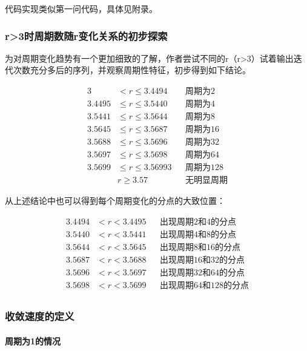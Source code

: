 \documentclass[10pt, a4paper]{article}
\begin{document}
    代码实现类似第一问代码，具体见附录。

    \subsubsection{r>3时周期数随r变化关系的初步探索}

    为对周期变化趋势有一个更加细致的了解，作者尝试不同的r（r>3）试着输出迭代次数充分多后的序列，并观察周期性特征，初步得到如下结论。

    \begin{align*}
        3&<r\le 3.4494 & &\text{周期为2}\\
        3.4495&\le r \le 3.5440 & &\text{周期为4}\\
        3.5441&\le r \le 3.5644 & &\text{周期为8}\\
        3.5645&\le r \le 3.5687 & &\text{周期为16}\\
        3.5688&\le r \le 3.5696 & &\text{周期为32}\\
        3.5697&\le r \le 3.5698 & &\text{周期为64}\\
        3.5699&\le r \le 3.56993 & &\text{周期为128}\\
        &r\ge3.57 & &\text{无明显周期}
    \end{align*}

    从上述结论中也可以得到每个周期变化的分点的大致位置：

    \begin{align*}
        3.4494&< r < 3.4495 & &\text{出现周期2和4的分点}\\
        3.5440&< r < 3.5441 & &\text{出现周期4和8的分点}\\
        3.5644&< r < 3.5645 & &\text{出现周期8和16的分点}\\
        3.5687&< r < 3.5688 & &\text{出现周期16和32的分点}\\
        3.5696&< r < 3.5697 & &\text{出现周期32和64的分点}\\
        3.5698&< r < 3.5699 & &\text{出现周期64和128的分点}\\
    \end{align*}\label{分点估计}

    \subsubsection{收敛速度的定义}

    \paragraph{周期为1的情况}
\end{document}
